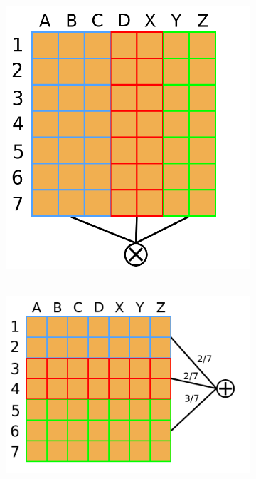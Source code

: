 \documentclass{amsart}
\theoremstyle{plain}
\numberwithin{equation}{section}
\begin{document}
\begin{figure}[h]
  \centering
  \begin{subfigure}{0.49\linewidth}
    \centering
    \includegraphics[scale=0.2]{imgs/split-v.png}
    \caption{~}\label{fig:split-v}
  \end{subfigure}
  \begin{subfigure}{0.49\linewidth}
    \centering
    \includegraphics[scale=0.2]{imgs/split-h.png}

\end{subfigure}
\end{figure}
\end{document}
